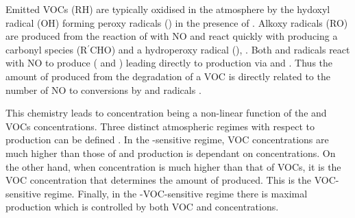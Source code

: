 Emitted VOCs (RH) are typically oxidised in the atmosphere by the hydoxyl radical (OH) forming peroxy radicals () in the presence of  . 
Alkoxy radicals (RO) are produced from the reaction of  with NO  and react quickly with  producing a carbonyl species (R$^{\prime}$CHO) and a hydroperoxy radical (), .
Both  and  radicals react with NO to produce  ( and ) leading directly to  production via  and . 
Thus the amount of  produced from the degradation of a VOC is directly related to the number of NO to  conversions by  and  radicals \citep{Atkinson:2000}.
\begin{reactionlist}
\end{reactionlist}

This chemistry leads to  concentration being a non-linear function of the  and VOCs concentrations. 
Three distinct atmospheric regimes with respect to  production can be defined \citep{Jenkin:2000}. 
In the -sensitive regime, VOC concentrations are much higher than those of  and  production is dependant on  concentrations. 
On the other hand, when  concentration is much higher than that of VOCs, it is the VOC concentration that determines the amount of  produced. 
This is the VOC-sensitive regime. 
Finally, in the -VOC-sensitive regime there is maximal  production which is controlled by both VOC and  concentrations.

